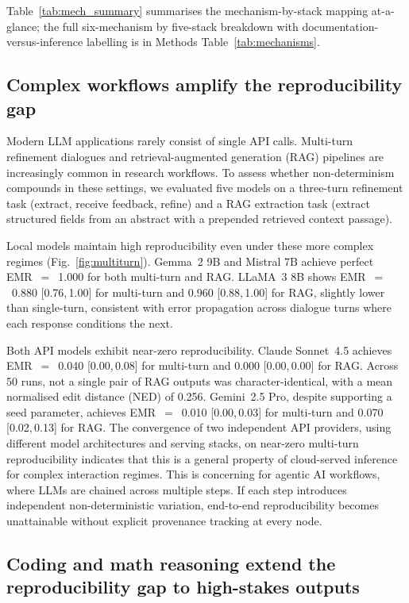 \documentclass[sn-nature]{sn-jnl}
\begin{document}
Table~\ref{tab:mech_summary} summarises the mechanism-by-stack mapping at-a-glance; the full six-mechanism by five-stack breakdown with documentation-versus-inference labelling is in Methods Table~\ref{tab:mechanisms}.


\subsection{Complex workflows amplify the reproducibility gap}\label{subsec:multiturn}

Modern LLM applications rarely consist of single API calls.
Multi-turn refinement dialogues and retrieval-augmented generation (RAG) pipelines are increasingly common in research workflows.
To assess whether non-determinism compounds in these settings, we evaluated five models on a three-turn refinement task (extract, receive feedback, refine) and a RAG extraction task (extract structured fields from an abstract with a prepended retrieved context passage).

Local models maintain high reproducibility even under these more complex regimes (Fig.~\ref{fig:multiturn}).
Gemma~2 9B and Mistral 7B achieve perfect EMR~$=$~1.000 for both multi-turn and RAG.
LLaMA~3 8B shows EMR~$=$~0.880 [0.76,\,1.00] for multi-turn and 0.960 [0.88,\,1.00] for RAG, slightly lower than single-turn, consistent with error propagation across dialogue turns where each response conditions the next.

Both API models exhibit near-zero reproducibility.
Claude Sonnet~4.5 achieves EMR~$=$~0.040 [0.00,\,0.08] for multi-turn and 0.000 [0.00,\,0.00] for RAG. Across 50 runs, not a single pair of RAG outputs was character-identical, with a mean normalised edit distance (NED) of 0.256.
Gemini~2.5 Pro, despite supporting a seed parameter, achieves EMR~$=$~0.010 [0.00,\,0.03] for multi-turn and 0.070 [0.02,\,0.13] for RAG.
The convergence of two independent API providers, using different model architectures and serving stacks, on near-zero multi-turn reproducibility indicates that this is a general property of cloud-served inference for complex interaction regimes.
This is concerning for agentic AI workflows, where LLMs are chained across multiple steps.
If each step introduces independent non-deterministic variation, end-to-end reproducibility becomes unattainable without explicit provenance tracking at every node.


\subsection{Coding and math reasoning extend the reproducibility gap to high-stakes outputs}\label{subsec:codemath}
\end{document}
